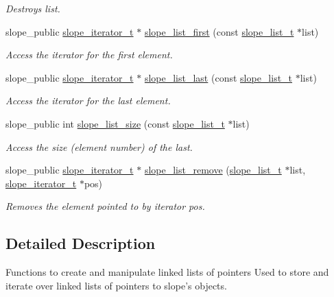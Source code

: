 \begin{DoxyCompactItemize}
\begin{DoxyCompactList}\small\item\em Destroys list. \end{DoxyCompactList}\item 
slope\+\_\+public \hyperlink{group__List_gaad13ce078b8dfe56e5a54bafc9aff9af}{slope\+\_\+iterator\+\_\+t} $\ast$ \hyperlink{group__List_ga7fbf15803b6c95dc32989a0d9170f145}{slope\+\_\+list\+\_\+first} (const \hyperlink{group__List_ga88326d377deca937191acac6784bff0e}{slope\+\_\+list\+\_\+t} $\ast$list)
\begin{DoxyCompactList}\small\item\em Access the iterator for the first element. \end{DoxyCompactList}\item 
slope\+\_\+public \hyperlink{group__List_gaad13ce078b8dfe56e5a54bafc9aff9af}{slope\+\_\+iterator\+\_\+t} $\ast$ \hyperlink{group__List_ga3b742a38cf861650f7b1a15ae038fac9}{slope\+\_\+list\+\_\+last} (const \hyperlink{group__List_ga88326d377deca937191acac6784bff0e}{slope\+\_\+list\+\_\+t} $\ast$list)
\begin{DoxyCompactList}\small\item\em Access the iterator for the last element. \end{DoxyCompactList}\item 
slope\+\_\+public int \hyperlink{group__List_gadbc1b27be93a2a166071c14ebb008359}{slope\+\_\+list\+\_\+size} (const \hyperlink{group__List_ga88326d377deca937191acac6784bff0e}{slope\+\_\+list\+\_\+t} $\ast$list)
\begin{DoxyCompactList}\small\item\em Access the size (element number) of the last. \end{DoxyCompactList}\item 
slope\+\_\+public \hyperlink{group__List_gaad13ce078b8dfe56e5a54bafc9aff9af}{slope\+\_\+iterator\+\_\+t} $\ast$ \hyperlink{group__List_ga0066274727609b058da0b561743dc318}{slope\+\_\+list\+\_\+remove} (\hyperlink{group__List_ga88326d377deca937191acac6784bff0e}{slope\+\_\+list\+\_\+t} $\ast$list, \hyperlink{group__List_gaad13ce078b8dfe56e5a54bafc9aff9af}{slope\+\_\+iterator\+\_\+t} $\ast$pos)
\begin{DoxyCompactList}\small\item\em Removes the element pointed to by iterator pos. \end{DoxyCompactList}\end{DoxyCompactItemize}


\subsection{Detailed Description}
Functions to create and manipulate linked lists of pointers Used to store and iterate over linked lists of pointers to slope's objects. 

